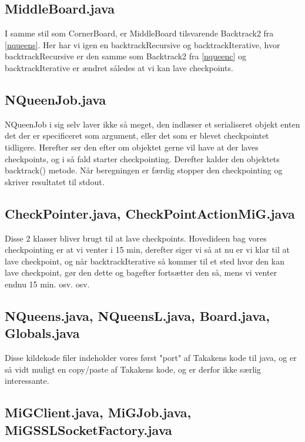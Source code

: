 \documentclass[final,a4paper,11pt]{article}
\begin{document}
\subsection{MiddleBoard.java}

I samme stil som CornerBoard, er MiddleBoard tilsvarende Backtrack2 fra
\ref{nqueens}. Her har vi igen en backtrackRecursive og backtrackIterative, hvor
backtrackRecursive er den samme som Backtrack2 fra \ref{nqueenc} og
backtrackIterative er ændret således at vi kan lave checkpoints.

\subsection{NQueenJob.java}

NQueenJob i sig selv laver ikke så meget, den indlæser et serialiseret objekt
enten det der er specificeret som argument, eller det som er blevet checkpointet
tidligere. Herefter ser den efter om objektet gerne vil have at der laves
checkpoints, og i så fald starter checkpointing. Derefter kalder den objektets
backtrack() metode. Når beregningen er færdig stopper den checkpointing og
skriver resultatet til stdout.

\subsection{CheckPointer.java, CheckPointActionMiG.java}

Disse 2 klasser bliver brugt til at lave checkpoints. Hovedideen bag vores
checkpointing er at vi venter i 15 min, derefter siger vi så at nu er vi klar
til at lave checkpoint, og når backtrackIterative så kommer til et sted hvor den
kan lave checkpoint, gør den dette og bagefter fortsætter den så, mens vi venter
endnu 15 min. osv. osv. 

\subsection{NQueens.java, NQueensL.java, Board.java, Globals.java}

Disse kildekode filer indeholder vores først "port" af Takakens kode til java,
og er så vidt muligt en copy/paste af Takakens kode, og er derfor ikke særlig
interessante. 

\subsection{MiGClient.java, MiGJob.java, MiGSSLSocketFactory.java}
\end{document}
